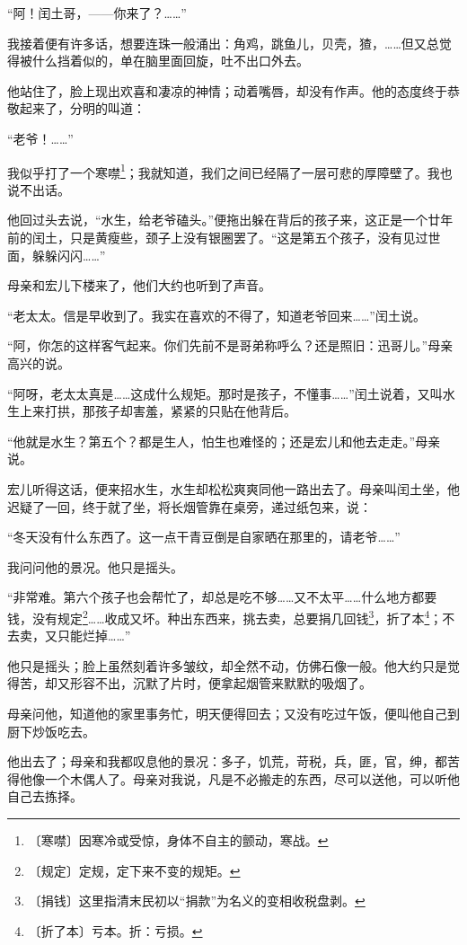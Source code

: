 \documentclass[12pt,UTF-8,openany]{ctexbook}
\begin{document}
\begin{normalsize}
    “阿！闰土哥，——你来了？……”
    
    我接着便有许多话，想要连珠一般涌出：角鸡，跳鱼儿，贝壳，猹，……但又总觉得被什么挡着似的，单在脑里面回旋，吐不出口外去。
    
    他站住了，脸上现出欢喜和凄凉的神情；动着嘴唇，却没有作声。他的态度终于恭敬起来了，分明的叫道：
    
    “老爷！……”
    
    我似乎打了一个寒噤\footnote{〔寒噤〕因寒冷或受惊，身体不自主的颤动，寒战。}；我就知道，我们之间已经隔了一层可悲的厚障壁了。我也说不出话。
    
    他回过头去说，“水生，给老爷磕头。”便拖出躲在背后的孩子来，这正是一个廿年前的闰土，只是黄瘦些，颈子上没有银圈罢了。“这是第五个孩子，没有见过世面，躲躲闪闪……”
    
    母亲和宏儿下楼来了，他们大约也听到了声音。
    
    “老太太。信是早收到了。我实在喜欢的不得了，知道老爷回来……”闰土说。
    
    “阿，你怎的这样客气起来。你们先前不是哥弟称呼么？还是照旧：迅哥儿。”母亲高兴的说。
    
    “阿呀，老太太真是……这成什么规矩。那时是孩子，不懂事……”闰土说着，又叫水生上来打拱，那孩子却害羞，紧紧的只贴在他背后。
    
    “他就是水生？第五个？都是生人，怕生也难怪的；还是宏儿和他去走走。”母亲说。
    
    宏儿听得这话，便来招水生，水生却松松爽爽同他一路出去了。母亲叫闰土坐，他迟疑了一回，终于就了坐，将长烟管靠在桌旁，递过纸包来，说：
    
    “冬天没有什么东西了。这一点干青豆倒是自家晒在那里的，请老爷……”
    
    我问问他的景况。他只是摇头。
    
    “非常难。第六个孩子也会帮忙了，却总是吃不够……又不太平……什么地方都要钱，没有规定\footnote{〔规定〕定规，定下来不变的规矩。}……收成又坏。种出东西来，挑去卖，总要捐几回钱\footnote{〔捐钱〕这里指清末民初以“捐款”为名义的变相收税盘剥。}，折了本\footnote{〔折了本〕亏本。折：亏损。}；不去卖，又只能烂掉……”
    
    他只是摇头；脸上虽然刻着许多皱纹，却全然不动，仿佛石像一般。他大约只是觉得苦，却又形容不出，沉默了片时，便拿起烟管来默默的吸烟了。
    
    母亲问他，知道他的家里事务忙，明天便得回去；又没有吃过午饭，便叫他自己到厨下炒饭吃去。
    
    他出去了；母亲和我都叹息他的景况：多子，饥荒，苛税，兵，匪，官，绅，都苦得他像一个木偶人了。母亲对我说，凡是不必搬走的东西，尽可以送他，可以听他自己去拣择。
    

\end{normalsize}
\end{document}
